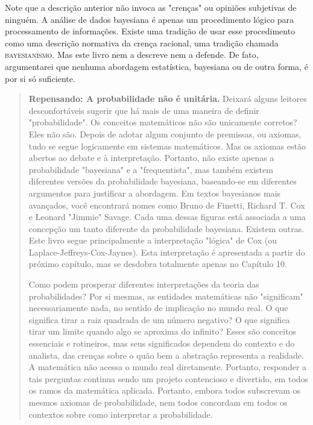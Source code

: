 Note que a descrição anterior não invoca as "crenças" ou opiniões subjetivas de ninguém. A análise de dados bayesiana é apenas um procedimento lógico para processamento de informações. Existe uma tradição de usar esse procedimento como uma descrição normativa da crença racional, uma tradição chamada \textsc{bayesianismo}. Mas este livro nem a descreve nem a defende. De fato, argumentarei que nenhuma abordagem estatística, bayesiana ou de outra forma, é por si só suficiente.

\begin{quote}
  \textbf{Repensando: A probabilidade não é unitária.} Deixará alguns leitores desconfortáveis sugerir que há mais de uma maneira de definir "probabilidade". Os conceitos matemáticos não são unicamente corretos? Eles não são. Depois de adotar algum conjunto de premissas, ou axiomas, tudo se segue logicamente em sistemas matemáticos. Mas os axiomas estão abertos ao debate e à interpretação. Portanto, não existe apenas a probabilidade "bayesiana" e a "frequentista", mas também existem diferentes versões da probabilidade bayesiana, baseando-se em diferentes argumentos para justificar a abordagem. Em textos bayesianos mais avançados, você encontrará nomes como Bruno de Finetti, Richard T. Cox e Leonard "Jimmie" Savage. Cada uma dessas figuras está associada a uma concepção um tanto diferente da probabilidade bayesiana. Existem outras. Este livro segue principalmente a interpretação "lógica" de Cox (ou Laplace-Jeffreys-Cox-Jaynes). Esta interpretação é apresentada a partir do próximo capítulo, mas se desdobra totalmente apenas no Capítulo 10.

  Como podem prosperar diferentes interpretações da teoria das probabilidades? Por si mesmas, as entidades matemáticas não "significam" necessariamente nada, no sentido de implicação no mundo real. O que significa tirar a raiz quadrada de um número negativo? O que significa tirar um limite quando algo se aproxima do infinito? Esses são conceitos essenciais e rotineiros, mas seus significados dependem do contexto e do analista, das crenças sobre o quão bem a abstração representa a realidade. A matemática não acessa o mundo real diretamente. Portanto, responder a tais perguntas continua sendo um projeto contencioso e divertido, em todos os ramos da matemática aplicada. Portanto, embora todos subscrevam os mesmos axiomas de probabilidade, nem todos concordam em todos os contextos sobre como interpretar a probabilidade.
\end{quote}


